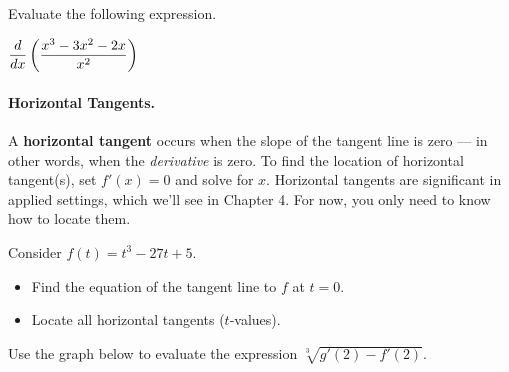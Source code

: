 \documentclass[12pt]{article}
\begin{document}
\Example Evaluate the following expression.

\vspace{5mm}

\hspace{10mm}$\displaystyle\frac{d}{dx}\left(\frac{x^3-3x^2-2x}{x^2}\right)$

\newpage

\paragraph{Horizontal Tangents.} A \textbf{horizontal tangent} occurs when the slope of the tangent line is zero --- in other words, when the \textit{derivative} is zero. To find the location of horizontal tangent(s), set $f'(x)=0$ and solve for $x$. Horizontal tangents are significant in applied settings, which we'll see in Chapter 4. For now, you only need to know how to locate them.

\Example Consider $f(t)=t^3-27t+5$.
\begin{itemize}
	\item[\tc{1}] Find the equation of the tangent line to $f$ at $t=0$.
	
	\vspace{30mm}
	
	\item[\tc{2}] Locate all horizontal tangents ($t$-values).
	
	\vspace{30mm}
	
\end{itemize}

\Example Use the graph below to evaluate the expression $\sqrt[3]{g'(2)-f'(2)}$.

\begin{center}
        \end{center}
        
\end{document}
